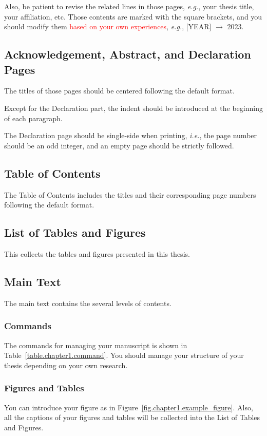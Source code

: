 Also, be patient to revise the related lines in those pages, \textit{e.g.}, your thesis title, your affiliation, etc.
Those contents are marked with the square brackets, and you should modify them \textcolor{red}{based on your own experiences}, \textit{e.g.}, {[YEAR]} $\rightarrow$ 2023.

\subsection{Acknowledgement, Abstract, and Declaration Pages}
The titles of those pages should be centered following the default format.

Except for the Declaration part, the indent should be introduced at the beginning of each paragraph.

The Declaration page should be single-side when printing, \textit{i.e.}, the page number should be an odd integer, and an empty page should be strictly followed.

\subsection{Table of Contents}
The Table of Contents includes the titles and their corresponding page numbers following the default format.

\subsection{List of Tables and Figures}
\label{lotf}
This collects the tables and figures presented in this thesis.

\subsection{Main Text}

The main text contains the several levels of contents.

\subsubsection{Commands}
The commands for managing your manuscript is shown in Table~\ref{table.chapter1.command}.
You should manage your structure of your thesis depending on your own research.


\subsubsection{Figures and Tables}
You can introduce your figure as in Figure~\ref{fig.chapter1.example_figure}.
Also, all the captions of your figures and tables will be collected into the List of Tables and Figures.


